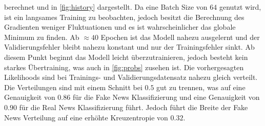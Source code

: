 berechnet und in \ref{fig:history} dargestellt. 
Da eine Batch Size von $64$ genutzt wird, ist ein langsames Training zu beobachten, jedoch besitzt die Berechnung 
des Gradienten weniger Fluktuationen und es ist wahrscheinlicher das globale Minimum zu finden. 
Ab $\approx 40$ Epochen ist das Modell nahezu ausgelernt und der Validierungsfehler bleibt nahezu konstant und 
nur der Trainingsfehler sinkt. 
Ab diesem Punkt beginnt das Modell leicht überzutrainieren, jedoch besteht kein starkes Übertraining, was auch in 
\ref{fig:probs} zusehen ist.
Die vorhergesagten Likelihoods sind bei Trainings- und Validierungsdatensatz nahezu gleich verteilt.
Die Verteilungen sind mit einem Schnitt bei $0.5$ gut zu trennen, was auf eine Genauigkeit von $0.86$ für die 
Fake News Klassifizierung und eine Genauigkeit von $0.90$ für die Real News Klassifizierung führt.
Jedoch führt die Breite der Fake News Verteilung auf eine erhöhte Kreuzentropie von $0.32$.

